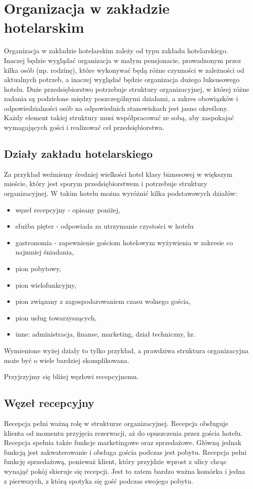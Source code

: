 \documentclass[a4paper,onecolumn,oneside,11pt,wide,floatssmall]{mwrep}
\theoremstyle{definition}
\theoremstyle{plain}%
\theoremstyle{remark}
\begin{document}
\section{Organizacja w zakładzie hotelarskim}
Organizacja w zakładzie hotelarskim zależy od typu zakładu hotelarskiego. 
Inaczej będzie wyglądać organizacja w małym pensjonacie, prowadzonym przez 
kilka osób (np. rodzinę), które wykonywać będą różne czynności w zależności 
od aktualnych potrzeb, a inaczej wyglądać będzie organizacja dużego 
luksusowego hotelu. Duże przedsiębiorstwo potrzebuje struktury 
organizacyjnej, w której różne zadania są podzielone między poszczególnymi 
działami, a zakres obowiązków i odpowiedzialności osób na odpowiednich 
stanowiskach jest jasno określony. Każdy element takiej struktury musi 
współpracować ze sobą, aby zaspokajać wymagających gości i realizować cel 
przedsiębiorstwa.

\subsection{Działy zakładu hotelarskiego}
Za przykład weźmiemy średniej wielkości hotel klasy biznesowej w większym 
mieście, który jest sporym przedsiębiorstwem i potrzebuje struktury 
organizacyjnej. W takim hotelu można wyróżnić kilka podstawowych działów:

\begin{itemize}
  \item węzeł recepcyjny - opisany poniżej,
  \item służba pięter - odpowiada za utrzymanie czystości w hotelu
  \item gastronomia - zapewnienie gościom hotelowym wyżywienia w zakresie co najmniej śniadania,
  \item pion pobytowy,
  \item pion wielofunkcyjny,
  \item pion związany z zagospodarowaniem czasu wolnego gościa,
  \item pion usług towarzyszących,
  \item inne: administracja, finanse, marketing, dział techniczny, hr.
\end{itemize}

Wymienione wyżej działy to tylko przykład, a prawdziwa struktura 
organizacyjna może być o wiele bardziej skomplikowana.

Przyjrzyjmy się bliżej węzłowi recepcyjnemu.

\subsection{Węzeł recepcyjny}
Recepcja pełni ważną rolę w strukturze organizacyjnej. 
Recepcja obsługuje klienta od momentu przyjęcia rezerwacji, aż do 
opuszczenia przez gościa hotelu. Recepcja spełnia także funkcje marketingowe 
oraz sprzedażowe. Główną jednak funkcją jest zakwaterowanie i obsługa gościa 
podczas jest pobytu. Recepcja pełni funkcję sprzedażową, ponieważ klient, 
który przyjdzie wprost z ulicy chcąc wynająć pokój skieruje się recepcji. 
Jest to zatem  bardzo ważna komórka i jedna z pierwszych, z którą spotyka 
się gość podczas swojego pobytu.
\end{document}
